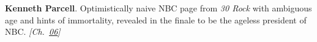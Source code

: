 \textbf{Kenneth Parcell}. Optimistically naive NBC page from \emph{30 Rock} with ambiguous age and hints of immortality, revealed in the finale to be the ageless president of NBC. \emph{[Ch.~\hyperref[ch:gravitytimedilation]{06}]}

